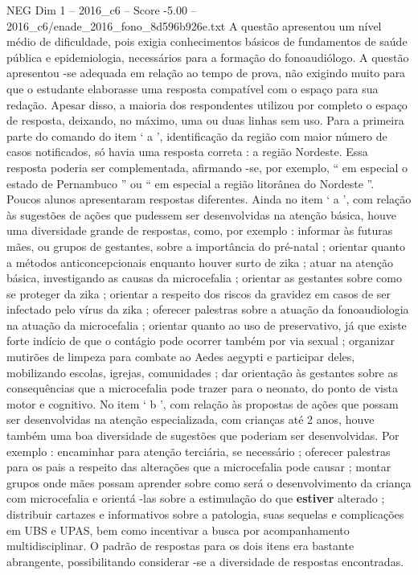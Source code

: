 \begin{textsample}{NEG Dim 1 – 2016\_c6 – Score -5.00 – 2016\_c6/enade\_2016\_fono\_8d596b926e.txt}
A questão apresentou um nível médio de dificuldade, pois exigia conhecimentos básicos de fundamentos de saúde pública e epidemiologia, necessários para a formação do fonoaudiólogo.
A questão apresentou -se adequada em relação ao tempo de prova, não exigindo muito para que o estudante elaborasse uma resposta compatível com o espaço para sua redação.
Apesar disso, a maioria dos respondentes utilizou por completo o espaço de resposta, deixando, no máximo, uma ou duas linhas sem uso.
Para a primeira parte do comando do item ‘ a ’, identificação da região com maior número de casos notificados, só havia uma resposta correta : a região Nordeste.
Essa resposta poderia ser complementada, afirmando -se, por exemplo, “ em especial o estado de Pernambuco ” ou “ em especial a região litorânea do Nordeste ”.
Poucos alunos apresentaram respostas diferentes.
Ainda no item ‘ a ’, com relação às sugestões de ações que pudessem ser desenvolvidas na atenção básica, houve uma diversidade grande de respostas, como, por exemplo : informar às futuras mães, ou grupos de gestantes, sobre a importância do pré-natal ; orientar quanto a métodos anticoncepcionais enquanto houver surto de zika ; atuar na atenção básica, investigando as causas da microcefalia ; orientar as gestantes sobre como se proteger da zika ; orientar a respeito dos riscos da gravidez em casos de ser infectado pelo vírus da zika ; oferecer palestras sobre a atuação da fonoaudiologia na atuação da microcefalia ; orientar quanto ao uso de preservativo, já que existe forte indício de que o contágio pode ocorrer também por via sexual ; organizar mutirões de limpeza para combate ao Aedes aegypti e participar deles, mobilizando escolas, igrejas, comunidades ; dar orientação às gestantes sobre as consequências que a microcefalia pode trazer para o neonato, do ponto de vista motor e cognitivo.
No item ‘ b ’, com relação às propostas de ações que possam ser desenvolvidas na atenção especializada, com crianças até 2 anos, houve também uma boa diversidade de sugestões que poderiam ser desenvolvidas.
Por exemplo : encaminhar para atenção terciária, se necessário ; oferecer palestras para os pais a respeito das alterações que a microcefalia pode causar ; montar grupos onde mães possam aprender sobre como será o desenvolvimento da criança com microcefalia e orientá -las sobre a estimulação do que \textbf{estiver} alterado ; distribuir cartazes e informativos sobre a patologia, suas sequelas e complicações em UBS e UPAS, bem como incentivar a busca por acompanhamento multidisciplinar.
O padrão de respostas para os dois itens era bastante abrangente, possibilitando considerar -se a diversidade de respostas encontradas.

\end{textsample}
